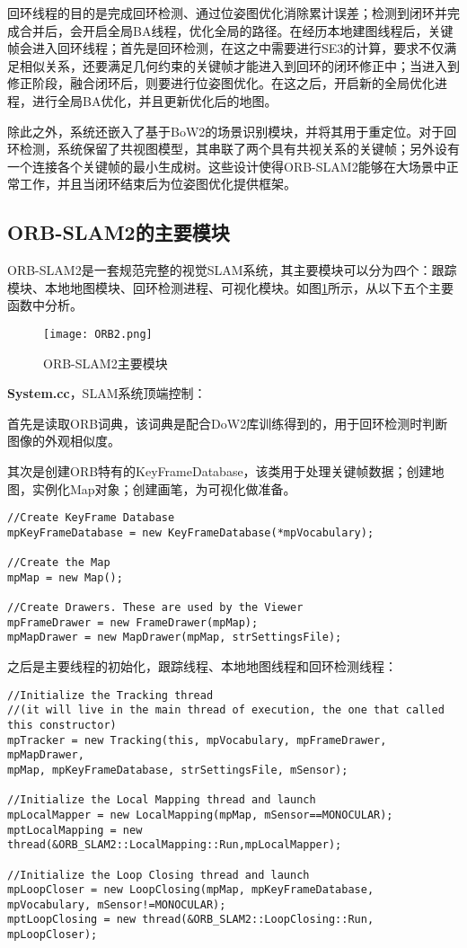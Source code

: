 回环线程的目的是完成回环检测、通过位姿图优化消除累计误差；检测到闭环并完成合并后，会开启全局BA线程，优化全局的路径。在经历本地建图线程后，关键帧会进入回环线程；首先是回环检测，在这之中需要进行SE3的计算，要求不仅满足相似关系，还要满足几何约束的关键帧才能进入到回环的闭环修正中；当进入到修正阶段，融合闭环后，则要进行位姿图优化。在这之后，开启新的全局优化进程，进行全局BA优化，并且更新优化后的地图。

除此之外，系统还嵌入了基于BoW2的场景识别模块，并将其用于重定位。对于回环检测，系统保留了共视图模型，其串联了两个具有共视关系的关键帧；另外设有一个连接各个关键帧的最小生成树。这些设计使得ORB-SLAM2能够在大场景中正常工作，并且当闭环结束后为位姿图优化提供框架。



\subsection{ORB-SLAM2的主要模块} \label{3.2.2}

ORB-SLAM2是一套规范完整的视觉SLAM系统，其主要模块可以分为四个：跟踪模块、本地地图模块、回环检测进程、可视化模块\cite{mur2017orb}。如图\ref{fig9}所示，从以下五个主要函数中分析。

\begin{figure}[!ht]
	\centering
	\texttt{[image: ORB2.png]}
	\caption{ORB-SLAM2主要模块}
	\label{fig9}
\end{figure}

\textbf{System.cc}，SLAM系统顶端控制：

首先是读取ORB词典，该词典是配合DoW2库训练得到的，用于回环检测时判断图像的外观相似度。

其次是创建ORB特有的KeyFrameDatabase，该类用于处理关键帧数据；创建地图，实例化Map对象；创建画笔，为可视化做准备。

\begin{verbatim}
//Create KeyFrame Database
mpKeyFrameDatabase = new KeyFrameDatabase(*mpVocabulary);

//Create the Map
mpMap = new Map();

//Create Drawers. These are used by the Viewer
mpFrameDrawer = new FrameDrawer(mpMap);
mpMapDrawer = new MapDrawer(mpMap, strSettingsFile);
\end{verbatim}

之后是主要线程的初始化，跟踪线程、本地地图线程和回环检测线程：
\begin{verbatim}
//Initialize the Tracking thread
//(it will live in the main thread of execution, the one that called this constructor)
mpTracker = new Tracking(this, mpVocabulary, mpFrameDrawer, mpMapDrawer,
mpMap, mpKeyFrameDatabase, strSettingsFile, mSensor);

//Initialize the Local Mapping thread and launch
mpLocalMapper = new LocalMapping(mpMap, mSensor==MONOCULAR);
mptLocalMapping = new thread(&ORB_SLAM2::LocalMapping::Run,mpLocalMapper);

//Initialize the Loop Closing thread and launch
mpLoopCloser = new LoopClosing(mpMap, mpKeyFrameDatabase, mpVocabulary, mSensor!=MONOCULAR);
mptLoopClosing = new thread(&ORB_SLAM2::LoopClosing::Run, mpLoopCloser);
\end{verbatim}

